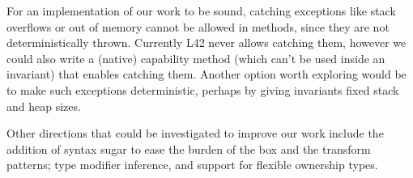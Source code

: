 


For an implementation of our work to be sound, catching exceptions like stack overflows or out of memory
cannot be allowed in \Q@invariant@ methods, since they are not deterministically thrown.
Currently L42 never allows catching them, however we could also write a (native) capability method (which can't be used inside an invariant) that enables catching them. Another option worth exploring would be to make such exceptions deterministic, perhaps by giving invariants fixed stack and heap sizes.

Other directions that could be investigated to improve our work include the addition of syntax sugar to ease the burden of the box and the transform patterns; type modifier inference, and support for flexible ownership types.



